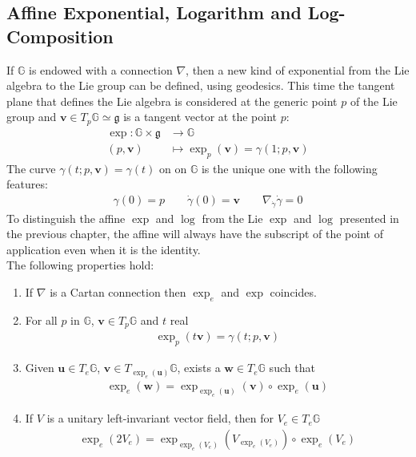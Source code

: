 \subsection{Affine Exponential, Logarithm and Log-Composition}
If $\mathbb{G} $ is endowed with a connection $\nabla$, then a new kind of exponential from the Lie algebra to the Lie group can be defined, using geodesics. This time the tangent plane that defines the Lie algebra is considered at the generic point $p$ of the Lie group and $\mathbf{v} \in T_{p}\mathbb{G}\simeq \mathfrak{g}$ is a tangent vector at the point $p$: 
\begin{align*}
\exp :  \mathbb{G}  \times \mathfrak{g}     &\longrightarrow \mathbb{G}  
\\ 
(p,\mathbf{v}) &\longmapsto \exp_{p}(\mathbf{v})  = \gamma(1; p,\mathbf{v})
\end{align*}
The curve $\gamma(t;p,\mathbf{v}) = \gamma(t)$ on on $\mathbb{G}$ is the unique one with the following features:  
\begin{align*}
\gamma(0) = p\qquad  \dot{\gamma}(0) =  \mathbf{v} \qquad \nabla_{\dot{\gamma}}\dot{\gamma} = 0 
\end{align*}
To distinguish the affine $\exp$ and $\log$ from the Lie $\exp$ and $\log$ presented in the previous chapter, the affine will always have the subscript of the point of application even when it is the identity.\\
The following properties hold:
\begin{enumerate}
	\item If $\nabla$ is a Cartan connection then $\exp_{e}$ and $\exp$ coincides.
	\item For all $p$ in $\mathbb{G}$, $\mathbf{v} \in T_{p}\mathbb{G}$ and $t$ real
	\begin{align*}
	\exp _{p}(t\mathbf{v})  = \gamma(t; p,\mathbf{v})
	\end{align*}
	\item Given $\mathbf{u} \in T_{e}\mathbb{G}$, $\mathbf{v} \in T_{\exp _{e}(\mathbf{u})}\mathbb{G}$, exists a $\mathbf{w} \in T_{e}\mathbb{G}$ such that 
	\begin{align*}
	\exp_{e}(\mathbf{w})  = \exp_{\exp _{e}(\mathbf{u})}(\mathbf{v}) \circ  \exp _{e}(\mathbf{u})
	\end{align*}
	\item If $V$ is a unitary left-invariant vector field, then for $V_{e} \in T_{e}\mathbb{G}$
	\begin{align*}
	\exp_{e}(2V_{e})  = \exp_{\exp _{e}(V_{e})}(V_{\exp _{e}(V_{e})}) \circ  \exp _{e}(V_{e})
	\end{align*}
\end{enumerate}
